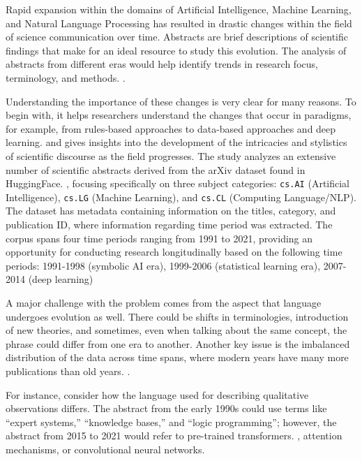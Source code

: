 \documentclass{article}
\begin{document}
Rapid expansion within the domains of Artificial Intelligence,
Machine Learning, and Natural Language Processing has
resulted in drastic changes within the field of science
communication over time. Abstracts are brief descriptions of
scientific findings that make for an ideal resource to study
this evolution. The analysis of abstracts from different eras
would help identify trends in research focus, terminology,
and methods.
\citep{arxiv2020}.

Understanding the importance of these changes is very clear for many reasons. To begin with, it helps researchers understand the changes that occur in paradigms, for example, from rules-based approaches to data-based approaches and deep learning.
\citep{devlin-etal-2019-bert} and gives insights into the development of the intricacies and stylistics of scientific discourse as the field progresses.
The study analyzes an extensive number of scientific abstracts derived from the arXiv dataset found in HuggingFace.
\citep{arxiv2020}, focusing specifically on three subject
categories: \texttt{cs.AI} (Artificial Intelligence),
\texttt{cs.LG} (Machine Learning), and \texttt{cs.CL}
(Computing  Language/NLP). The dataset has metadata containing information on the
titles, category, and publication ID, where information
regarding time period was extracted. The corpus spans four
time periods ranging from 1991 to 2021, providing an opportunity
for conducting research longitudinally based on the following
time periods: 1991-1998 (symbolic AI era), 1999-2006
(statistical learning era), 2007-2014 (deep learning)

A major challenge with the problem comes from the aspect
that language undergoes evolution as well. There could
be shifts in terminologies, introduction of new theories,
and sometimes, even when talking about the same
concept, the phrase could differ from one era to another.
Another key issue is the imbalanced distribution
of the data across time spans, where modern years have
many more publications than old years.
\citep{scikit-learn, nltk}.

For instance, consider how the language used for describing qualitative observations differs.
The abstract from the early 1990s could use terms like “expert systems,” “knowledge bases,” and “logic programming”; however, the abstract from 2015 to 2021 would refer to pre-trained transformers.
\citep{devlin-etal-2019-bert}, attention mechanisms,
or convolutional neural networks.
\end{document}
